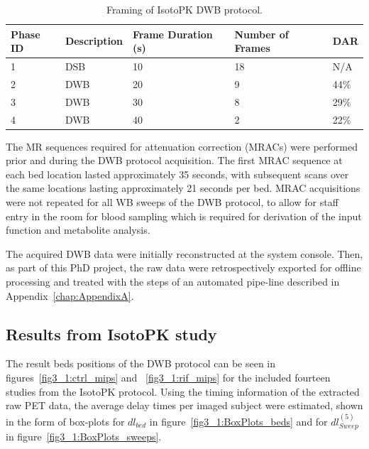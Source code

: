 \begin{table}[h!]
\centering
\caption{Framing of IsotoPK DWB protocol.}
\label{tab:IsotoPK_Framing}
\begin{tabular}{|l|l|l|l|l|}
\toprule
\textbf{Phase ID} & \textbf{Description}              & \textbf{Frame Duration (s)} & \textbf{Number of Frames} & \textbf{DAR} \\
\midrule
1        & DSB & 10                 & 18        & N/A                 \\
2        & DWB                      & 20                 & 9         & 44\%                \\
3        & DWB                      & 30                 & 8         & 29\%                \\
4        & DWB                      & 40                 & 2         & 22\%                \\
\bottomrule
\end{tabular}
\end{table}

The MR sequences required for attenuation correction (MRACs) were performed prior and during the DWB protocol acquisition. The first MRAC sequence at each bed location lasted approximately 35 seconds, with subsequent scans over the same locations lasting approximately 21 seconds per bed. MRAC acquisitions were not repeated for all WB sweeps of the DWB protocol, to allow for staff entry in the room for blood sampling which is required for derivation of the input function and metabolite analysis. 

The acquired DWB data were initially reconstructed at the system console.
Then, as part of this PhD project, the raw data were retrospectively exported for offline processing and treated with the steps of an automated pipe-line described in Appendix~\ref{chap:AppendixA}.

\subsection{Results from IsotoPK study}

The result beds positions of the DWB protocol can be seen in figures~\ref{fig3_1:ctrl_mips} and ~\ref{fig3_1:rif_mips} for the included fourteen studies from the IsotoPK protocol.
Using the timing information of the extracted raw PET data, the average delay times per imaged subject were estimated, shown in the form of box-plots for $dl_{bed}$ in figure~\ref{fig3_1:BoxPlots_beds} and for $dl_{Sweep}^{(5)}$ in figure~\ref{fig3_1:BoxPlots_sweeps}.

